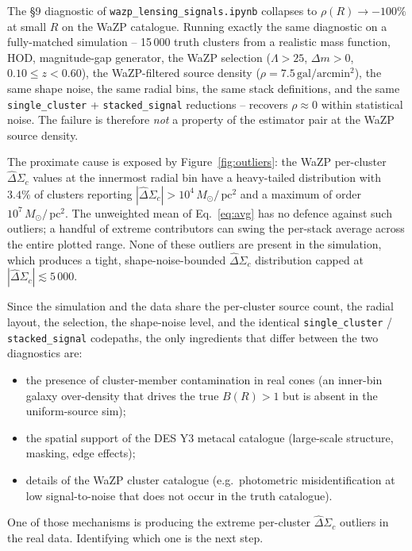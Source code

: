 \documentclass[11pt,a4paper]{article}
\newcommand{\DS}{\Delta\Sigma}
\newcommand{\Msun}{M_{\odot}}
\newcommand{\pc}{\,\mathrm{pc}}
\begin{document}
The §9 diagnostic of \verb|wazp_lensing_signals.ipynb| collapses to
$\rho(R) \to -100\%$ at small $R$ on the WaZP catalogue.  Running
exactly the same diagnostic on a fully-matched simulation -- 15\,000
truth clusters from a realistic mass function, HOD, magnitude-gap
generator, the WaZP selection ($\Lambda > 25$, $\Delta m > 0$,
$0.10 \le z < 0.60$), the WaZP-filtered source density
($\rho = 7.5\,\mathrm{gal}/\mathrm{arcmin}^{2}$), the same shape
noise, the same radial bins, the same stack definitions, and the same
\verb|single_cluster| + \verb|stacked_signal| reductions -- recovers
$\rho \approx 0$ within statistical noise.  The failure is therefore
\emph{not} a property of the estimator pair at the WaZP source
density.

The proximate cause is exposed by Figure~\ref{fig:outliers}: the WaZP
per-cluster $\widehat\DS_c$ values at the innermost radial bin have a
heavy-tailed distribution with $3.4\%$ of clusters reporting
$|\widehat\DS_c| > 10^{4}\,\Msun/\pc^{2}$ and a maximum of order
$10^{7}\,\Msun/\pc^{2}$.  The unweighted mean of
Eq.~\eqref{eq:avg} has no defence against such outliers; a handful of
extreme contributors can swing the per-stack average across the entire
plotted range.  None of these outliers are present in the simulation,
which produces a tight, shape-noise-bounded
$\widehat\DS_c$ distribution capped at
$|\widehat\DS_c| \lesssim 5\,000$.

Since the simulation and the data share the per-cluster source count,
the radial layout, the selection, the shape-noise level, and the
identical \verb|single_cluster| / \verb|stacked_signal| codepaths,
the only ingredients that differ between the two diagnostics are:
\begin{itemize}
\item the presence of cluster-member contamination in real cones
      (an inner-bin galaxy over-density that drives the true
      $B(R) > 1$ but is absent in the uniform-source sim);
\item the spatial support of the DES Y3 metacal catalogue
      (large-scale structure, masking, edge effects);
\item details of the WaZP cluster catalogue (e.g.\ photometric
      misidentification at low signal-to-noise that does not occur in
      the truth catalogue).
\end{itemize}
One of those mechanisms is producing the extreme per-cluster
$\widehat\DS_c$ outliers in the real data.  Identifying which one is
the next step.
\end{document}
